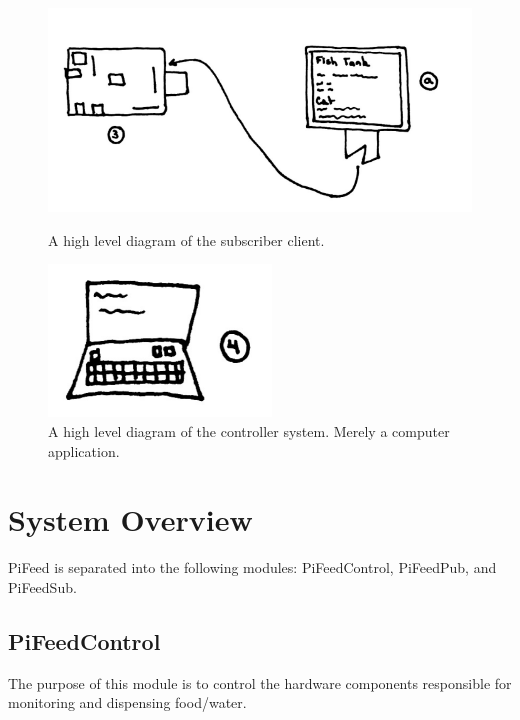 \begin{figure}[H]
    \centering
    \begin{minipage}[b]{0.45\linewidth}
        \centering
        \captionsetup{justification=centering, margin = 0.5cm}
        \includegraphics[scale=0.4]{images/Sub} 
        \caption{A high level diagram of the subscriber client.} 
        \label{fig:fig3}
    \end{minipage}
    \quad
    \begin{minipage}[b]{0.45\linewidth}
        \centering
        \captionsetup{justification=centering, margin = 0.5cm}
        \includegraphics[scale=0.7]{images/Controller} 
        \caption{A high level diagram of the controller system. Merely a
        computer application.}
        \label{fig:fig4}
    \end{minipage}
\end{figure}


\section{System Overview}
PiFeed is separated into the following modules: PiFeedControl, PiFeedPub, and
PiFeedSub.

\subsection{PiFeedControl}
The purpose of this module is to control the hardware components responsible
for monitoring and dispensing food/water.

